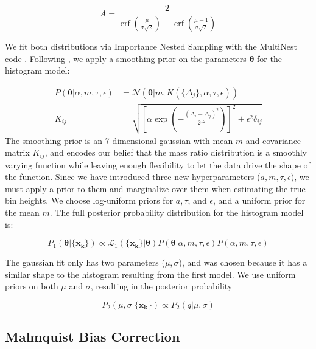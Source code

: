 \documentclass{emulateapj}
\renewcommand{\vec}[1]{\bm{#1}}
\DeclareMathOperator\erf{erf}
\begin{document}
\begin{equation}
A = \frac{2}{\erf\left(\frac{\mu}{\sigma \sqrt{2}}\right) - \erf\left(\frac{\mu - 1}{\sigma \sqrt{2}}\right)}
\end{equation}

We fit both distributions via Importance Nested Sampling with the MultiNest code \citep{multinest}. Following \citet{Foreman2014}, we apply a smoothing prior on the parameters $\vec{\theta}$ for the histogram model:

\begin{align}
P(\vec{\theta}| \alpha, m, \tau, \epsilon) &= \mathcal{N}(\vec{\theta} | m, K(\{\Delta_j\}, \alpha, \tau, \epsilon)) \\
K_{ij} &= \sqrt{\left[\alpha \exp{\left(-\frac{(\Delta_i - \Delta_j)^2}{2\tau^2}\right)}\right]^2 + \epsilon^2 \delta_{ij}}
\end{align}
The smoothing prior is an 7-dimensional gaussian with mean $m$ and covariance matrix $K_{ij}$, and encodes our belief that the mass ratio distribution is a smoothly varying function while leaving enough flexibility to let the data drive the shape of the function. Since we have introduced three new hyperparameters ($a, m, \tau, \epsilon$), we must apply a prior to them and marginalize over them when estimating the true bin heights. We choose log-uniform priors for $a, \tau$, and $\epsilon$, and a uniform prior for the mean $m$. The full posterior probability distribution for the histogram model is:

\begin{equation}
P_1(\vec{\theta} | \{\vec{x_k}\}) \propto \mathcal{L}_1(\{\vec{x_k}\}| \vec{\theta}) P(\vec{\theta}| \alpha, m, \tau, \epsilon) P(\alpha, m, \tau, \epsilon)
\end{equation}

The gaussian fit only has two parameters ($\mu, \sigma$), and was chosen because it has a similar shape to the histogram resulting from the first model. We use uniform priors on both $\mu$ and $\sigma$, resulting in the posterior probability 

\begin{equation}
P_2(\mu, \sigma | \{\vec{x_k}\}) \propto P_2(q|\mu, \sigma) 
\end{equation}

\subsection{Malmquist Bias Correction}
\end{document}
